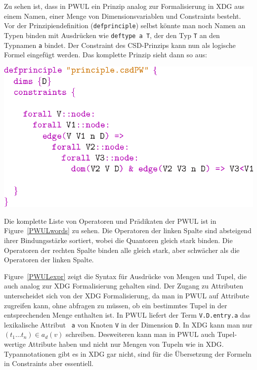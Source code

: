 Zu sehen ist, dass in PWUL ein Prinzip analog zur Formalisierung in
XDG aus einem Namen, einer Menge von Dimensionsvariablen und
Constraints besteht. Vor der Prinzipiendefinition ({\tt defprinciple})
selbst k\"onnte man noch Namen an Typen binden mit Ausdr\"ucken wie
{\tt deftype a T}, der den Typ {\tt T} an den Typnamen {\tt a} bindet.
Der Constraint des CSD-Prinzips kann nun als logische Formel
eingef\"ugt werden. Das komplette Prinzip sieht dann so aus:
\begin{center}
\includegraphics[scale=1.0]{eps/defprinciplecsd1}
\end{center}
    



Die komplette Liste von Operatoren und Pr\"adikaten der PWUL ist in
Figure~\ref{PWULwords} zu sehen. Die Operatoren der linken Spalte sind
absteigend ihrer Bindungsst\"arke sortiert, wobei die Quantoren gleich
stark binden. Die Operatoren der rechten Spalte binden alle gleich
stark, aber schw\"acher als die Operatoren der linken Spalte.

Figure~\ref{PWULexpr} zeigt die Syntax f\"ur Ausdr\"ucke von Mengen
und Tupel, die auch analog zur XDG Formalisierung gehalten sind. Der
Zugang zu Attributen unterscheidet sich von der XDG Formalisierung, da
man in PWUL auf Attribute zugreifen kann, ohne abfragen zu m\"ussen,
ob ein bestimmtes Tupel in der entsprechenden Menge enthalten ist. In
PWUL liefert der Term {\tt V.D.entry.a} das lexikalische Attribut {\tt
  a} von Knoten {\tt V} in der Dimension {\tt D}. In XDG kann man nur
$(t_1 \ldots t_n) \in a_d(v)$ schreiben. Desweiteren kann man in PWUL
auch Tupel-wertige Attribute haben und nicht nur Mengen von Tupeln wie
in XDG. Typannotationen gibt es in XDG gar nicht, sind f\"ur die
\"Ubersetzung der Formeln in Constraints aber essentiell.

